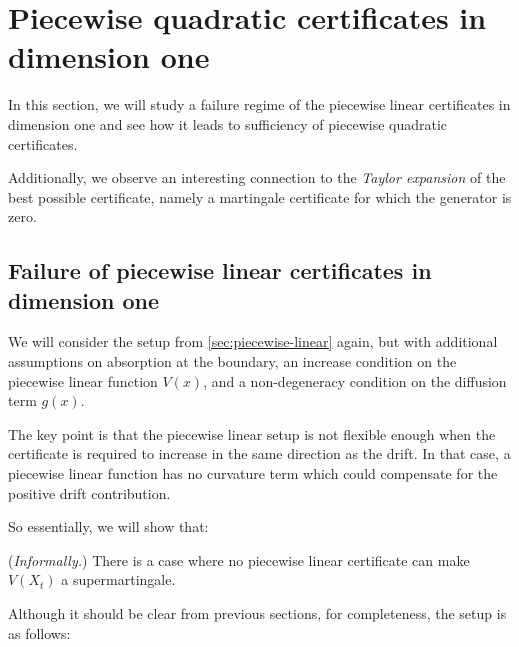 \section{Piecewise quadratic certificates in dimension one}
\label{sec:piecewise-quadratic}

In this section, we will study a failure regime of the piecewise
linear certificates in dimension one and see how it leads to sufficiency
of piecewise quadratic certificates.

Additionally, we observe an interesting connection to the \textit{Taylor expansion} of the best possible
certificate, namely a martingale certificate for which the generator is zero.

\subsection{Failure of piecewise linear certificates in dimension one}

We will consider the setup from \autoref{sec:piecewise-linear} again, but with
additional assumptions on absorption at the boundary, an increase condition on
the piecewise linear function $V(x)$, and a non-degeneracy condition on the
diffusion term $g(x)$.

The key point is that the piecewise linear setup is not flexible enough when
the certificate is required to increase in the same direction as the drift. In
that case, a piecewise linear function has no curvature term which could
compensate for the positive drift contribution.

So essentially, we will show that:
\begin{fact}
(\textit{Informally.}) There is a case where no piecewise linear certificate can make $V(X_t)$ a
supermartingale.
\end{fact}

Although it should be clear from previous sections, for completeness, the setup
is as follows:


